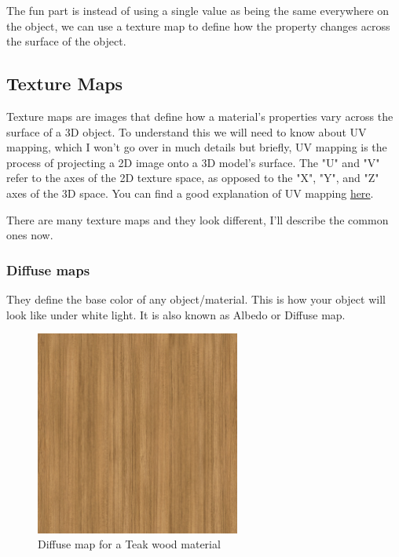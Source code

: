 \documentclass{article}
\begin{document}
The fun part is instead of using a single value as being the same everywhere on the object, we can use a texture map to define how the property changes across the surface of the object.

\subsection{Texture Maps}
Texture maps are images that define how a material's properties vary across the surface of a 3D object. To understand this we will need to know about UV mapping, which I won't go over in much details but briefly, UV mapping is the process of projecting a 2D image onto a 3D model's surface. The "U" and "V" refer to the axes of the 2D texture space, as opposed to the "X", "Y", and "Z" axes of the 3D space. You can find a good explanation of UV mapping \href{https://youtu.be/XeBUfMKKZDo?si=PByk-2xxJS7TuU2l}{here}.

There are many texture maps and they look different, I'll describe the common ones now.

\subsubsection{Diffuse maps}
They define the base color of any object/material. This is how your object will look like under white light. It is also known as Albedo or Diffuse map. 

\begin{figure}[h]
    \centering
    \includegraphics[width=0.6\textwidth]{week1/Teak_4k_Albedo.jpg}
    \caption{Diffuse map for a Teak wood material}
    \label{fig:diffuse_map}
\end{figure}
\end{document}
